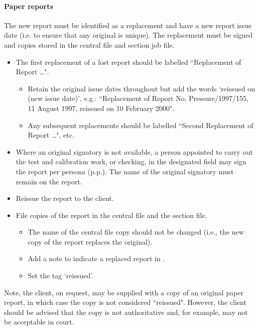 \paragraph{Paper reports}
The new report must be identified as a replacement and have a new report issue date (i.e. to ensure that any original is unique). The replacement must be signed and copies stored in the central file and section job file. 
\begin{itemize}
\item The first replacement of a lost report should be labelled ``Replacement of Report \ldots". 
\begin{itemize}
\item Retain the original issue dates throughout but add the words `reissued on (new issue date)', e.g.: ``Replacement of Report No. Pressure/1997/155, 11 August 1997, reissued on 10 February 2000".
\item Any subsequent replacements should be labelled ``Second Replacement of Report \ldots", etc.
\end{itemize}

\item Where an original signatory is not available, a person appointed to carry out the test and calibration work, or checking, in the designated field may sign the report per persona (p.p.).  The name of the original signatory must remain on the report.

\item Reissue the report to the client.

\item File copies of the report in the central file and the section file.
\begin{itemize}
\item The name of the central file copy should not be changed (i.e., the new copy of the report replaces the original). 
\item Add a note to indicate a replaced report in .
\item Set the  tag `reissued'.
\end{itemize}
\end{itemize}

Note, the client, on request, may be supplied with a copy of an original paper report, in which case the copy is not considered ``reissued". However, the client should be advised that the copy is not authoritative and, for example, may not be acceptable in court.


